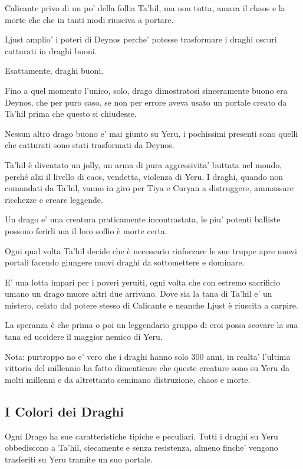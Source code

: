 \documentclass[a4paper,11pt,twoside,openany]{book}
\begin{document}
Calicante privo di un po' della follia Ta'hil, ma non tutta, amava il chaos e la morte che che in tanti modi riusciva a portare.

Ljust amplio' i poteri di Deynos perche' potesse trasformare i draghi oscuri catturati in draghi buoni.

Esattamente, draghi buoni.

Fino a quel momento l'unico, solo, drago dimostratosi sinceramente buono era Deynos, che per puro caso, se non per errore aveva usato un portale creato da Ta'hil prima che questo si chiudesse.

Nessun altro drago buono e' mai giunto su Yeru, i pochissimi presenti sono quelli che catturati sono stati trasformati da Deynos.

Ta'hil è diventato un jolly, un arma di pura aggressivita' buttata nel mondo, perché alzi il livello di caos, vendetta, violenza di Yeru.
I draghi, quando non comandati da Ta'hil, vanno in giro per Tiya e Curyan a distruggere, ammassare ricchezze e creare leggende.

Un drago e' una creatura praticamente incontrastata, le piu' potenti balliste possono ferirli ma il loro soffio è morte certa.

Ogni qual volta Ta'hil decide che è necessario rinforzare le sue truppe apre nuovi portali facendo giungere nuovi draghi da sottomettere e dominare.

E' una lotta impari per i poveri yeruiti, ogni volta che con estremo sacrificio umano un drago muore altri due arrivano. Dove sia la tana di Ta'hil e' un mistero, celato dal potere stesso di  Calicante e neanche Ljust è riuscita a carpire.

La speranza è che prima o poi un leggendario gruppo di eroi possa scovare la sua tana ed uccidere il maggior nemico di Yeru.

Nota: purtroppo no e' vero che i draghi hanno solo 300 anni, in realta' l'ultima vittoria del millennio ha fatto dimenticare che queste creature sono su Yeru da molti millenni e da altrettanto seminano distruzione, chaos e morte.

\subsection{I Colori dei Draghi}

Ogni Drago ha sue caratteristiche tipiche e peculiari.
Tutti i draghi su Yeru obbediscono a Ta'hil, ciecamente e senza resistenza, almeno finche' vengono trasferiti su Yeru tramite un suo portale.
\end{document}
